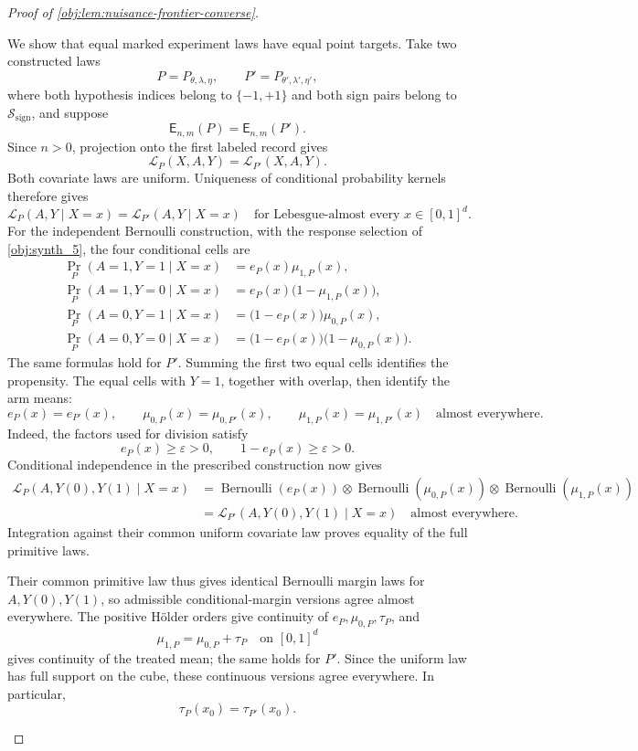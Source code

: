 \documentclass[11pt]{article}
\begin{document}
\begin{proof}[Proof of \cref{obj:lem:nuisance-frontier-converse}]
\begin{enumerate}
We show that equal marked experiment laws have equal point targets. Take two constructed laws
\[
P=P_{\theta,\lambda,\eta},\qquad
P'=P_{\theta',\lambda',\eta'},
\]
where both hypothesis indices belong to \(\{-1,+1\}\) and both sign pairs belong to \(\mathcal S_{\mathrm{sign}}\), and suppose
\[
\mathsf E_{n,m}(P)=\mathsf E_{n,m}(P').
\]
Since \(n>0\), projection onto the first labeled record gives
\[
\mathcal L_P(X,A,Y)=\mathcal L_{P'}(X,A,Y).
\]
Both covariate laws are uniform. Uniqueness of conditional probability kernels therefore gives
\[
\mathcal L_P(A,Y\mid X=x)
=
\mathcal L_{P'}(A,Y\mid X=x)
\quad\text{for Lebesgue-almost every }x\in[0,1]^d.
\]
For the independent Bernoulli construction, with the response selection of \cref{obj:synth_5}, the four conditional cells are
\[
\begin{aligned}
\Pr_P(A=1,Y=1\mid X=x)
 &=e_P(x)\mu_{1,P}(x),\\
\Pr_P(A=1,Y=0\mid X=x)
 &=e_P(x)\bigl(1-\mu_{1,P}(x)\bigr),\\
\Pr_P(A=0,Y=1\mid X=x)
 &=\bigl(1-e_P(x)\bigr)\mu_{0,P}(x),\\
\Pr_P(A=0,Y=0\mid X=x)
 &=\bigl(1-e_P(x)\bigr)\bigl(1-\mu_{0,P}(x)\bigr).
\end{aligned}
\]
The same formulas hold for \(P'\). Summing the first two equal cells identifies the propensity. The equal cells with \(Y=1\), together with overlap, then identify the arm means:
\[
e_P(x)=e_{P'}(x),\qquad
\mu_{0,P}(x)=\mu_{0,P'}(x),\qquad
\mu_{1,P}(x)=\mu_{1,P'}(x)
\quad\text{almost everywhere}.
\]
Indeed, the factors used for division satisfy
\[
e_P(x)\ge\varepsilon>0,\qquad 1-e_P(x)\ge\varepsilon>0.
\]
Conditional independence in the prescribed construction now gives
\[
\begin{aligned}
\mathcal L_P(A,Y(0),Y(1)\mid X=x)
&=\operatorname{Bernoulli}(e_P(x))
  \otimes\operatorname{Bernoulli}(\mu_{0,P}(x))
  \otimes\operatorname{Bernoulli}(\mu_{1,P}(x))\\
&=\mathcal L_{P'}(A,Y(0),Y(1)\mid X=x)
\quad\text{almost everywhere}.
\end{aligned}
\]
Integration against their common uniform covariate law proves equality of the full primitive laws.

Their common primitive law thus gives identical Bernoulli margin laws for \(A,Y(0),Y(1)\), so admissible conditional-margin versions agree almost everywhere. The positive Hölder orders give continuity of \(e_P,\mu_{0,P},\tau_P\), and
\[
\mu_{1,P}=\mu_{0,P}+\tau_P
\quad\text{on }[0,1]^d
\]
gives continuity of the treated mean; the same holds for \(P'\). Since the uniform law has full support on the cube, these continuous versions agree everywhere. In particular,
\[
\tau_P(x_0)=\tau_{P'}(x_0).
\]


\end{enumerate}
\end{proof}
\end{document}
